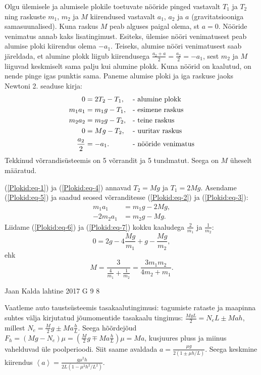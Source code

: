 \documentclass[11pt, twoside]{article}
\begin{document}
{{\ifSolution
Olgu ülemisele ja alumisele plokile toetuvate nööride pinged vastavalt $T_1$ ja $T_2$ ning raskuste $m_1$, $m_2$ ja $M$ kiirendused vastavalt $a_1$, $a_2$ ja $a$ (gravitatsiooniga samasuunalised). Kuna raskus $M$ peab alguses paigal olema, st $a = 0$. Nööride venimatus annab kaks lisatingimust. Esiteks, ülemise nööri venimatusest peab alumise ploki kiirendus olema $-a_1$. Teiseks, alumise nööri venimatusest saab järeldada, et alumine plokk liigub kiirendusega $\frac{a_2 + a}{2} = \frac{a_2}{2} = -a_1$, sest $m_2$ ja $M$ liiguvad keskmiselt sama palju kui alumine plokk. Kuna nöörid on kaalutud, on nende pinge igas punktis sama. Paneme alumise ploki ja iga raskuse jaoks Newtoni 2. seaduse kirja:
\begin{align}
0 &= 2T_2 - T_1,				& &\text{- alumine plokk}\label{Plokid:eq-1}\\
m_1a_1 &= m_1g - T_1,			& &\text{- esimene raskus}\label{Plokid:eq-2}\\
m_2a_2 &= m_2g - T_2,			& &\text{- teine raskus}\label{Plokid:eq-3}\\
0 &= Mg - T_2,					& &\text{- uuritav raskus}\label{Plokid:eq-4}\\
\frac{a_2}{2} &= -a_1.			& &\text{- nööride venimatus\label{Plokid:eq-5}}
\end{align}
Tekkinud võrrandisüsteemis on 5 võrrandit ja 5 tundmatut. Seega on $M$ üheselt määratud.

(\ref{Plokid:eq-1}) ja (\ref{Plokid:eq-4}) annavad $T_2 = Mg$ ja $T_1 = 2Mg$. Asendame (\ref{Plokid:eq-5}) ja saadud seosed võrranditesse (\ref{Plokid:eq-2}) ja (\ref{Plokid:eq-3}):
\begin{align}
m_1a_1 &= m_1g - 2Mg, \label{Plokid:eq-6}\\
-2m_2a_1 &= m_2g - Mg. \label{Plokid:eq-7}
\end{align}
Liidame (\ref{Plokid:eq-6}) ja (\ref{Plokid:eq-7}) kokku kaaludega $\frac{2}{m_1}$ ja $\frac{1}{m_2}$:
\[
0 = 2g - 4\frac{Mg}{m_1} + g - \frac{Mg}{m_2},
\]
ehk
\[
M = \frac{3}{\frac{4}{m_1} + \frac{1}{m_2}} = \frac{3m_1m_2}{4m_2 + m_1}.
\]
\fi
}

{Jaan Kalda} %
{lahtine} %
{2017} %
{G 9} %
{8} %
{

\ifSolution
Vaatleme auto taustsüsteemis tasakaalutingimusi: tagumiste rataste ja maapinna suhtes välja kirjutatud jõumomentide tasakaalu tingimus: $\frac {MgL}2=N_eL\pm Mah$, millest $N_e=\frac M2g\pm Ma\frac hL$. Seega hõõrdejõud $F_h=(Mg-N_e)\mu=(\frac M2g\mp Ma\frac hL)\mu=Ma$, kusjuures pluss ja miinus vahelduvad üle poolperioodi. Siit saame avaldada $a=\frac{\mu g}{2(1\pm \mu h/L)}$. Seega keskmine kiirendus $\left< a\right>=\frac{g\mu^2h}{2L(1-\mu^2h^2/L^2)}.$
\fi
}

}
\end{document}
